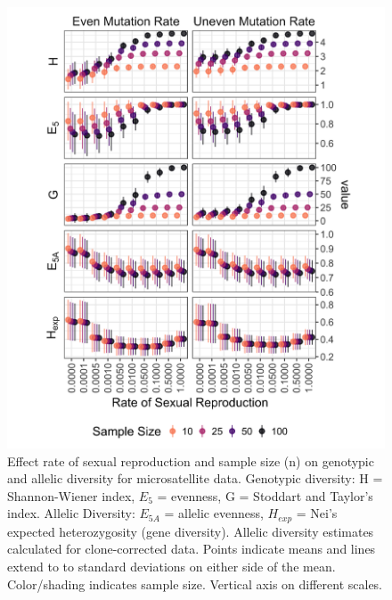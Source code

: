 \documentclass[double,11pt]{beavtex}
\begin{document}
  \begin{figure}
  
  {\centering \includegraphics[width=0.8\linewidth]{figure/simulations/diversity_stats} 
  
  }
  
  \caption[The effect rate of sexual reproduction and sample size on
  genotypic and allelic diversity for microsatellite data.]{Effect rate of sexual reproduction and sample size (n) on genotypic and
  allelic diversity for microsatellite data. Genotypic diversity: H =
  Shannon-Wiener index, \(E_5\) = evenness, G = Stoddart and Taylor's
  index. Allelic Diversity: \(E_{5A}\) = allelic evenness, \(H_{exp}\) =
  Nei's expected heterozygosity (gene diversity). Allelic diversity
  estimates calculated for clone-corrected data. Points indicate means and
  lines extend to to standard deviations on either side of the mean.
  Color/shading indicates sample size. Vertical axis on different scales.}\label{fig:simdiv}
  \end{figure}
  
  \newpage
  
\end{document}
